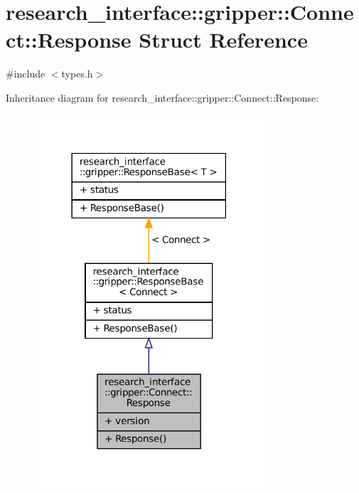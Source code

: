 \hypertarget{structresearch__interface_1_1gripper_1_1Connect_1_1Response}{}\section{research\+\_\+interface\+:\+:gripper\+:\+:Connect\+:\+:Response Struct Reference}
\label{structresearch__interface_1_1gripper_1_1Connect_1_1Response}


{\ttfamily \#include $<$types.\+h$>$}



Inheritance diagram for research\+\_\+interface\+:\+:gripper\+:\+:Connect\+:\+:Response\+:
\nopagebreak
\begin{figure}[H]
\begin{center}
\leavevmode
\includegraphics[width=242pt]{structresearch__interface_1_1gripper_1_1Connect_1_1Response__inherit__graph}
\end{center}
\end{figure}


